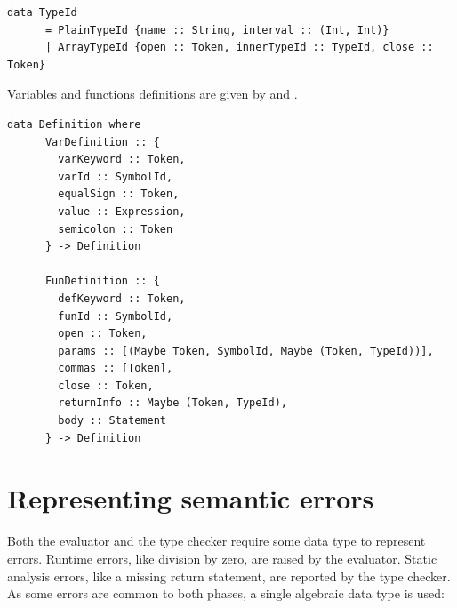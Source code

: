 \documentclass[UdineBachThesis,american,11pt,draft]{PhdThesis}
\begin{document}
  \begin{lstlisting}[gobble=4,basicstyle=\ttfamily\small]
    data TypeId
      = PlainTypeId {name :: String, interval :: (Int, Int)}
      | ArrayTypeId {open :: Token, innerTypeId :: TypeId, close :: Token}
  \end{lstlisting}

  Variables and functions definitions are given by \lstinline@VarDefinition@ and
  \lstinline@FunDefinition@.

  \begin{lstlisting}[gobble=4,basicstyle=\ttfamily\small]
    data Definition where
      VarDefinition :: {
        varKeyword :: Token,
        varId :: SymbolId,
        equalSign :: Token,
        value :: Expression,
        semicolon :: Token
      } -> Definition

      FunDefinition :: {
        defKeyword :: Token,
        funId :: SymbolId,
        open :: Token,
        params :: [(Maybe Token, SymbolId, Maybe (Token, TypeId))],
        commas :: [Token],
        close :: Token,
        returnInfo :: Maybe (Token, TypeId),
        body :: Statement
      } -> Definition
  \end{lstlisting}

  \section{Representing semantic errors}

  Both the evaluator and the type checker require some data type to represent
  errors. Runtime errors, like division by zero, are raised by the evaluator.
  Static analysis errors, like a missing return statement, are reported by the
  type checker. As some errors are common to both phases, a single algebraic
  data type is used:
\end{document}
